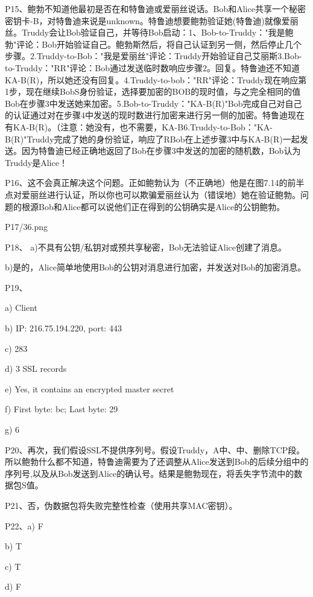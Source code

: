 \documentclass[11pt,UTF8,twoside]{article}
\begin{document}
{		P15、鲍勃不知道他最初是否在和特鲁迪或爱丽丝说话。Bob和Alice共享一个秘密密钥卡-B，对特鲁迪来说是unknown。特鲁迪想要鲍勃验证她(特鲁迪)就像爱丽丝。Truddy会让Bob验证自己，并等待Bob启动：1、Bob-to-Truddy："我是鲍勃"评论：Bob开始验证自己。鲍勃斯然后，将自己认证到另一侧，然后停止几个步骤。2.Truddy-to-Bob："我是爱丽丝"评论：Truddy开始验证自己艾丽斯3.Bob-to-Truddy："RR"评论：Bob通过发送临时数响应步骤2。回复。特鲁迪还不知道KA-B(R)，所以她还没有回复。4.Truddy-to-bob："RR"评论：Truddy现在响应第1步，现在继续BobS身份验证，选择要加密的BOB的现时值，与之完全相同的值Bob在步骤3中发送她来加密。5.Bob-to-Truddy："KA-B(R)"Bob完成自己对自己的认证通过对在步骤4中发送的现时数进行加密来进行另一侧的加密。特鲁迪现在有KA-B(R)。（注意：她没有，也不需要，KA-B6.Truddy-to-Bob："KA-B(R)"Truddy完成了她的身份验证，响应了RBob在上述步骤3中与KA-B(R)一起发送。因为特鲁迪已经正确地返回了Bob在步骤3中发送的加密的随机数，Bob认为Truddy是Alice！
		
		P16、这不会真正解决这个问题。正如鲍勃认为（不正确地）他是在图7.14的前半点对爱丽丝进行认证，所以你也可以欺骗爱丽丝认为（错误地）她在验证鲍勃。问题的根源Bob和Alice都可以说他们正在得到的公钥确实是Alice的公钥鲍勃。
		
		P17/36.png
		
		P18、
		a)不具有公钥/私钥对或预共享秘密，Bob无法验证Alice创建了消息。
		
		b)是的，Alice简单地使用Bob的公钥对消息进行加密，并发送对Bob的加密消息。
		
		P19、
		
		a) Client 

		b) IP: 216.75.194.220, port: 443 

		c) 283 

		d) 3 SSL records 

		e) Yes, it contains an encrypted master secret 

		f) First byte: bc; Last byte: 29 

		g) 6 

		
		P20、再次，我们假设SSL不提供序列号。假设Truddy，A中、中、删除TCP段。所以鲍勃什么都不知道，特鲁迪需要为了还调整从Alice发送到Bob的后续分组中的序列号,以及从Bob发送到Alice的确认号。结果是鲍勃现在，将丢失字节流中的数据包S值。
		
		P21、否，伪数据包将失败完整性检查（使用共享MAC密钥）。
		
		P22、a) F

		b) T

		c) T

		d) F

		
		
}
\end{document}

